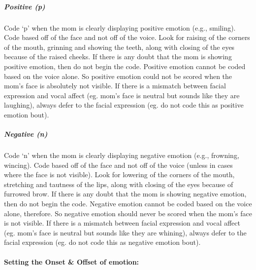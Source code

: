 \documentclass[
]{book}
\begin{document}
\hypertarget{mom_pos_emo}{%
\subparagraph*{Positive (p)}\label{mom_pos_emo}}

Code `p' when the mom is clearly displaying positive emotion (e.g., smiling). Code based off of the face and not off of the voice. Look for raising of the corners of the mouth, grinning and showing the teeth, along with closing of the eyes because of the raised cheeks. If there is any doubt that the mom is showing positive emotion, then do not begin the code.
Positive emotion cannot be coded based on the voice alone. So positive emotion could not be scored when the mom's face is absolutely not visible. If there is a mismatch between facial expression and vocal affect (eg. mom's face is neutral but sounds like they are laughing), always defer to the facial expression (eg. do not code this as positive emotion bout).

\hypertarget{mom_neg_emo}{%
\subparagraph*{Negative (n)}\label{mom_neg_emo}}

Code `n' when the mom is clearly displaying negative emotion (e.g., frowning, wincing). Code based off of the face and not off of the voice (unless in cases where the face is not visible). Look for lowering of the corners of the mouth, stretching and tautness of the lips, along with closing of the eyes because of furrowed brow. If there is any doubt that the mom is showing negative emotion, then do not begin the code.
Negative emotion cannot be coded based on the voice alone, therefore. So negative emotion should never be scored when the mom's face is not visible. If there is a mismatch between facial expression and vocal affect (eg. mom's face is neutral but sounds like they are whining), always defer to the facial expression (eg. do not code this as negative emotion bout).

\hypertarget{setting-the-onset-offset-of-emotion-2}{%
\paragraph{Setting the Onset \& Offset of emotion:}\label{setting-the-onset-offset-of-emotion-2}}
\end{document}

